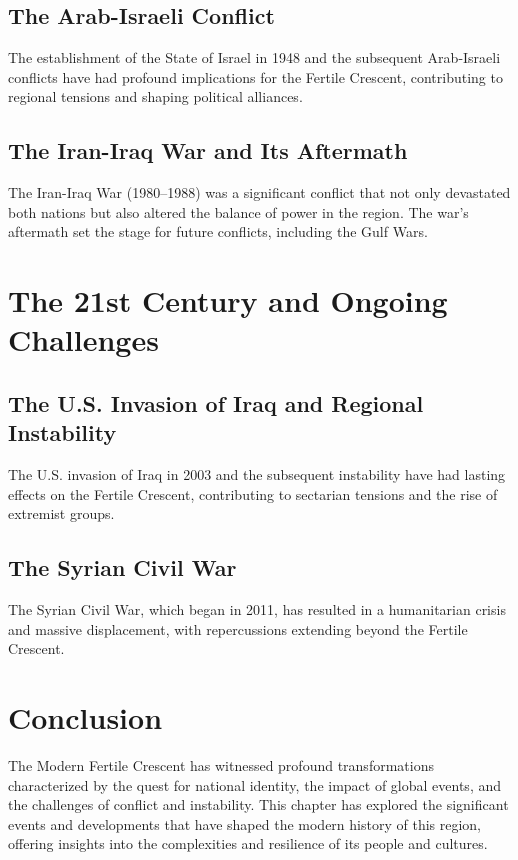 \documentclass{book}
\begin{document}
\subsection{The Arab-Israeli Conflict}
The establishment of the State of Israel in 1948 and the subsequent Arab-Israeli conflicts have had profound implications for the Fertile Crescent, contributing to regional tensions and shaping political alliances.

\subsection{The Iran-Iraq War and Its Aftermath}
The Iran-Iraq War (1980–1988) was a significant conflict that not only devastated both nations but also altered the balance of power in the region. The war's aftermath set the stage for future conflicts, including the Gulf Wars.

\section{The 21st Century and Ongoing Challenges}
\label{sec:21st-century-challenges}

\subsection{The U.S. Invasion of Iraq and Regional Instability}
The U.S. invasion of Iraq in 2003 and the subsequent instability have had lasting effects on the Fertile Crescent, contributing to sectarian tensions and the rise of extremist groups.

\subsection{The Syrian Civil War}
The Syrian Civil War, which began in 2011, has resulted in a humanitarian crisis and massive displacement, with repercussions extending beyond the Fertile Crescent.

\section{Conclusion}
\label{sec:conclusion-modern-fertile-crescent}

The Modern Fertile Crescent has witnessed profound transformations characterized by the quest for national identity, the impact of global events, and the challenges of conflict and instability. This chapter has explored the significant events and developments that have shaped the modern history of this region, offering insights into the complexities and resilience of its people and cultures.
\end{document}
